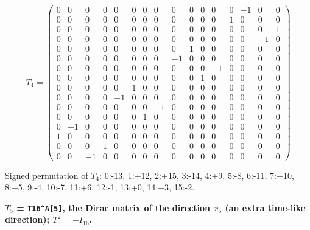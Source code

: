 \documentclass[
  10pt,
]{article}
\begin{document}
\[
T_4 = \scriptstyle \begin{pmatrix} 0 & 0 & 0 & 0 & 0 & 0 & 0 & 0 & 0 & 0 & 0 & 0 & 0 & -1 & 0 & 0 \\ 0 & 0 & 0 & 0 & 0 & 0 & 0 & 0 & 0 & 0 & 0 & 0 & 1 & 0 & 0 & 0 \\ 0 & 0 & 0 & 0 & 0 & 0 & 0 & 0 & 0 & 0 & 0 & 0 & 0 & 0 & 0 & 1 \\ 0 & 0 & 0 & 0 & 0 & 0 & 0 & 0 & 0 & 0 & 0 & 0 & 0 & 0 & -1 & 0 \\ 0 & 0 & 0 & 0 & 0 & 0 & 0 & 0 & 0 & 1 & 0 & 0 & 0 & 0 & 0 & 0 \\ 0 & 0 & 0 & 0 & 0 & 0 & 0 & 0 & -1 & 0 & 0 & 0 & 0 & 0 & 0 & 0 \\ 0 & 0 & 0 & 0 & 0 & 0 & 0 & 0 & 0 & 0 & 0 & -1 & 0 & 0 & 0 & 0 \\ 0 & 0 & 0 & 0 & 0 & 0 & 0 & 0 & 0 & 0 & 1 & 0 & 0 & 0 & 0 & 0 \\ 0 & 0 & 0 & 0 & 0 & 1 & 0 & 0 & 0 & 0 & 0 & 0 & 0 & 0 & 0 & 0 \\ 0 & 0 & 0 & 0 & -1 & 0 & 0 & 0 & 0 & 0 & 0 & 0 & 0 & 0 & 0 & 0 \\ 0 & 0 & 0 & 0 & 0 & 0 & 0 & -1 & 0 & 0 & 0 & 0 & 0 & 0 & 0 & 0 \\ 0 & 0 & 0 & 0 & 0 & 0 & 1 & 0 & 0 & 0 & 0 & 0 & 0 & 0 & 0 & 0 \\ 0 & -1 & 0 & 0 & 0 & 0 & 0 & 0 & 0 & 0 & 0 & 0 & 0 & 0 & 0 & 0 \\ 1 & 0 & 0 & 0 & 0 & 0 & 0 & 0 & 0 & 0 & 0 & 0 & 0 & 0 & 0 & 0 \\ 0 & 0 & 0 & 1 & 0 & 0 & 0 & 0 & 0 & 0 & 0 & 0 & 0 & 0 & 0 & 0 \\ 0 & 0 & -1 & 0 & 0 & 0 & 0 & 0 & 0 & 0 & 0 & 0 & 0 & 0 & 0 & 0 \end{pmatrix}
\]

Signed permutation of \(T_4\): 0:-13, 1:+12, 2:+15, 3:-14, 4:+9, 5:-8,
6:-11, 7:+10, 8:+5, 9:-4, 10:-7, 11:+6, 12:-1, 13:+0, 14:+3, 15:-2.

\textbf{\(T_5\) = \texttt{T16\^{}A{[}5{]}}, the Dirac matrix of the
direction \(x_5\) (an extra time-like direction); \(T_5^2 = -I_{16}\).}
\end{document}
